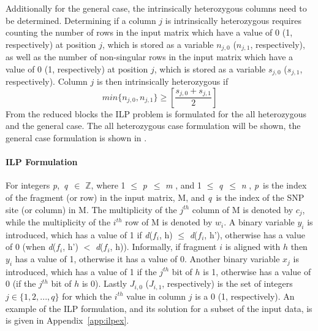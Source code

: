 \documentclass[10pt,twocolumn]{article}
\newcommand{\M}{\textit{m }}
\newcommand{\N}{\textit{n }}
\newcommand{\D}{\textit{d}}
\newcommand{\PP}{\textit{p}}
\newcommand{\QQ}{\textit{q}}
\begin{document}
Additionally for the general case, the intrinsically heterozygous columns need to be determined. 
Determining if a column $j$ is intrinsically heterozygous requires counting the number of rows in the input matrix which
have a value of 0 (1, respectively) at position $j$, which is stored as a variable $n_{j,0}$ ($n_{j,1}$,
respectively), as well as the
number of non-singular rows in the input matrix which have a value of 0 (1, respectively) at position $j$, which is stored
as a variable $s_{j,0}$ ($s_{j,1}$, respectively). Column $j$ is then intrinsically heterozygous if
\begin{equation*}
    min\{n_{j,0},n_{j,1}\} \ge \left[ \frac{s_{j,0} + s_{j,1}}{2} \right]
\end{equation*}
From the reduced blocks the ILP problem is formulated for the all heterozygous and the general case. The
all heterozygous case formulation will be shown, the general case formulation is shown in \cite{sup:2013}. 

\paragraph{ILP Formulation} \label{ssec:ilpform}

For integers \PP,\ \QQ\ $\in$ $\mathbb{Z}$, where 1 $\le$ \PP\ $\le$ \M, and 1 $\le$ \QQ\ $\le$ \N, \PP\ is the 
index of the fragment (or row) in the input matrix, M, and \QQ\ is the index of the SNP site (or column) in M. 
The multiplicity of the $j^{th}$ column of M is denoted by $c_j$, while the multiplicity of the
$i^{th}$ row of M is denoted by $w_i$. A binary variable $y_i$ is introduced, which has a value of 1 if \D($f_i$, h) $\le$ \D($f_i$, h'), otherwise 
has a value of 0 (when \D($f_i$, h') $<$ \D($f_i$, h)). Informally, if fragment $i$ is aligned with $h$ then $y_i$ 
has a value of 1, otherwise it has a value of 0. Another binary variable $x_j$ is introduced, which has a value of 1 if the $j^{th}$ bit of 
$h$ is 1, otherwise has a value of 0 (if the $j^{th}$ bit of $h$ is 0). 
Lastly $J_{i,0}$ ($J_{i,1}$, respectively) is the set of integers $j \in \{1,2,...,q\}$ for which 
the $i^{th}$ value in column $j$ is a 0 (1, respectively). An example of the ILP formulation, and its solution
for a subset of the input data, is is given in Appendix~\ref{app:ilpex}.
\end{document}
